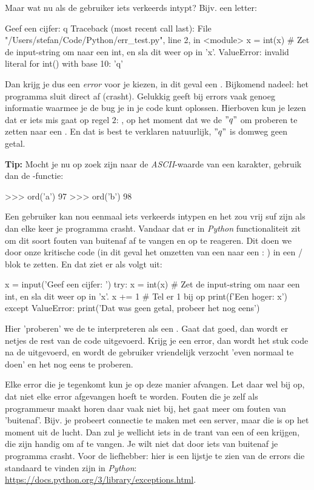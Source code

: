 Maar wat nu als de gebruiker iets verkeerds intypt? Bijv. een letter:
\begin{python}
Geef een cijfer: q
Traceback (most recent call last):
  File "/Users/stefan/Code/Python/err_test.py", line 2, in <module>
    x = int(x)  # Zet de input-string om naar een int, en sla dit weer op in 'x'.
ValueError: invalid literal for int() with base 10: 'q'
\end{python}
Dan krijg je dus een \textit{error} voor je kiezen, in dit geval een . Bijkomend nadeel: het programma sluit direct af (crasht). Gelukkig geeft  bij errors vaak genoeg informatie waarmee je de bug je in je code kunt oplossen. Hierboven kun je lezen dat er iets mis gaat op regel $2$: , op het moment dat we de  $"q"$ om proberen te zetten naar een . En dat is best te verklaren natuurlijk, $"q"$ is domweg geen getal. 

\begin{remark}
\textbf{Tip: } Mocht je nu op zoek zijn naar de \textit{ASCII}-waarde van een karakter, gebruik dan de -functie:
\begin{python}
>>> ord('a')
97
>>> ord('b')
98
\end{python}
\end{remark}

Een gebruiker kan nou eenmaal iets verkeerds intypen en het zou vrij suf zijn als dan elke keer je programma crasht. Vandaar dat er in \textit{Python} functionaliteit zit om dit soort fouten van buitenaf af te vangen en op te reageren. Dit doen we door onze kritische code (in dit geval het omzetten van een  naar een : ) in een  /  blok te zetten. En dat ziet er als volgt uit:

\begin{python}
x = input('Geef een cijfer: ')
try:
	x = int(x)  # Zet de input-string om naar een int, en sla dit weer op in 'x'.
	x += 1  # Tel er 1 bij op
	print(f'Een hoger: {x}')
except ValueError:
    print('Dat was geen getal, probeer het nog eens')
\end{python}

Hier 'proberen' we de  te interpreteren als een . Gaat dat goed, dan wordt er netjes de rest van de code uitgevoerd. Krijg je een error, dan wordt het stuk code na de  uitgevoerd, en wordt de gebruiker vriendelijk verzocht 'even normaal te doen' en het nog eens te proberen. 

Elke error die je tegenkomt kun je op deze manier afvangen. Let daar wel bij op, dat niet elke error afgevangen hoeft te worden. Fouten die je zelf als programmeur maakt horen daar vaak niet bij, het gaat meer om fouten van 'buitenaf'. Bijv. je probeert connectie te maken met een server, maar die is op het moment uit de lucht. Dan zul je wellicht iets in de trant van een  of een  krijgen, die zijn handig om af te vangen. Je wilt niet dat door iets van buitenaf je programma crasht. Voor de liefhebber: hier is een lijstje te zien van de errors die standaard te vinden zijn in \textit{Python}: \url{https://docs.python.org/3/library/exceptions.html}.

